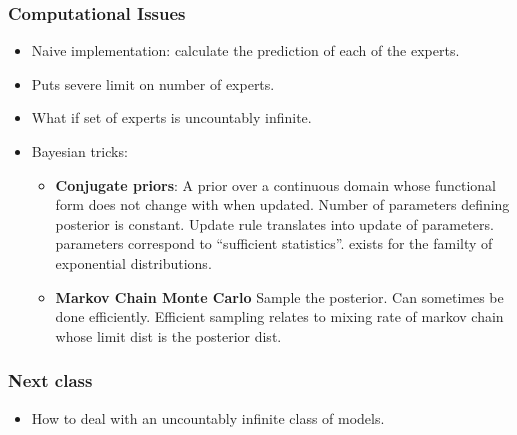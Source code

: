 \documentclass[handout]{beamer}
\newcommand{\R}[1]{{\color{red}{#1}}}
\begin{document}
\begin{frame}
\frametitle{Computational Issues}
\begin{itemize}
\item Naive implementation: calculate the prediction of each of 
the \R{$N$} experts.
\item Puts severe limit on number of experts.
\item What if set of experts is uncountably infinite.
\item Bayesian tricks:
\begin{itemize}
\item {\bf Conjugate priors}: A prior over a continuous domain whose functional form does not change with when updated. 
\pause Number of parameters defining posterior is constant. 
\pause Update rule translates into update of parameters.
\pause parameters correspond to ``sufficient statistics''.
\pause exists for the familty of exponential distributions.
\item {\bf Markov Chain Monte Carlo} Sample the posterior. 
\pause Can sometimes be done efficiently.
\pause Efficient sampling relates to mixing rate of markov chain whose limit dist is the posterior dist. 
\end{itemize}
\end{itemize}
\end{frame}

\begin{frame}
\frametitle{Next class}
\begin{itemize}
\item How to deal with an uncountably infinite class of models.
\end{itemize}
\end{frame}

\iffalse %

\begin{frame}
\frametitle{XXX}
\begin{itemize}
\item XXX
\end{itemize}
\end{frame}

\fi %
\end{document}
